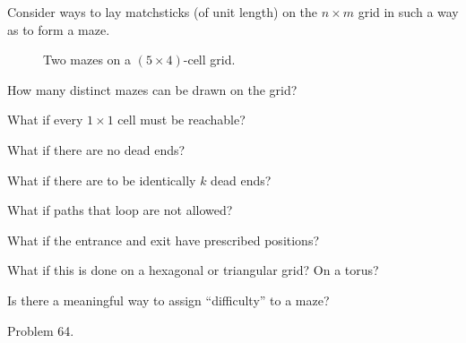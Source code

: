 \documentclass{article}
\begin{document}
Consider ways to lay matchsticks (of unit length) on the $n \times m$ grid in
such a way as to form a maze.
\begin{figure}[ht!]
  \centering
  \hspace{0.5cm}
  \caption{
    Two mazes on a $(5 \times 4)$-cell grid.
  }
\end{figure}
\begin{question}
  How many distinct mazes can be drawn on the grid?
\end{question}

\begin{related}
  \item What if every $1\times1$ cell must be reachable?
  \item What if there are no dead ends?
  \item What if there are to be identically $k$ dead ends?
  \item What if paths that loop are not allowed?
  \item What if the entrance and exit have prescribed positions?
  \item What if this is done on a hexagonal or triangular grid? On a torus?
  \item Is there a meaningful way to assign ``difficulty'' to a maze?
\end{related}
\begin{references}
  \item Problem 64.
\end{references}
\end{document}
